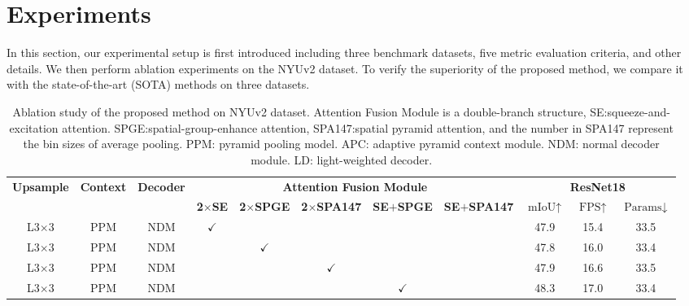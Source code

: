 \documentclass[journal,twoside,web]{ieeecolor}
\begin{document}
\section{Experiments}\label{sec:Experiments}
In this section, our experimental setup is first introduced including three benchmark datasets, five metric evaluation criteria, and other details. We then perform ablation experiments on the NYUv2 dataset. To verify the superiority of the proposed method, we compare it with the state-of-the-art (SOTA) methods on three datasets.
\begin{table*}[!t]
	\centering
	\renewcommand{\arraystretch}{1.2}
	\caption{Ablation study of the proposed method on NYUv2 dataset. Attention Fusion Module is a double-branch structure, SE:squeeze-and-excitation attention. SPGE:spatial-group-enhance attention, SPA147:spatial pyramid attention, and the number in SPA147 represent the bin sizes of average pooling. PPM: pyramid pooling model. APC: adaptive pyramid context module. NDM: normal decoder module. LD: light-weighted decoder.}
	\label{table1}
\footnotesize
	\begin{tabular}{ccccccccccc}
	\toprule \multicolumn{1}{c}{\multirow{2}{*}{\textbf{Upsample}}}&\multirow{2}{*}{\textbf{Context}}	& 	\multirow{2}{*}{\textbf{Decoder}} &
		\multicolumn{5}{c}{\textbf{Attention Fusion Module}}  	&
		\multicolumn{3}{c}{\textbf{ResNet18}} \\
		\cmidrule(r){4-8} \cmidrule(r){9-11}\multicolumn{1}{c}{} & & &\multicolumn{1}{c}{\textbf{\textrm{2$\times$SE}}}            			&
		\multicolumn{1}{c}{\textbf{\textrm{2$\times$SPGE}}}            			&
		\multicolumn{1}{c}{\textbf{\textrm{2$\times$SPA147}}}            		&
		\multicolumn{1}{c}{\textbf{\textrm{SE$+$SPGE}}}            		&
		\multicolumn{1}{c}{\textbf{\textrm{SE$+$SPA147}}}  &\multicolumn{1}{c}{\textbf{$\textrm{mIoU}\uparrow$}}&\textbf{$\textrm{FPS}\uparrow$} &\textbf{$\textrm{Params}\downarrow$}      \\
    \midrule
		L3$\times$3& PPM &NDM &\multicolumn{1}{c}{\multirow{1}{*}{$\checkmark$}}&  &  &   &  &47.9&15.4 &33.5 \\
		L3$\times$3& PPM &NDM& &\multicolumn{1}{c}{\multirow{1}{*}{$\checkmark$}} &    &    &    &47.8 &16.0 &33.4\\
		L3$\times$3& PPM &NDM& & &\multicolumn{1}{c}{\multirow{1}{*}{$\checkmark$}}&    & &47.9 &16.6&33.5 \\
	    L3$\times$3&PPM&NDM& & & &\multicolumn{1}{c}{\multirow{1}{*}{$\checkmark$}}&    &48.3&17.0&33.4 \\

\end{tabular}
\end{table*}
\end{document}
